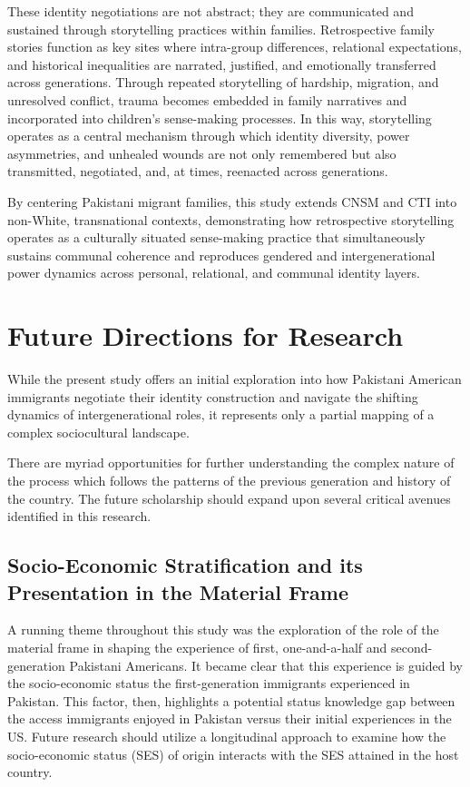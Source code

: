 These identity negotiations are not abstract; they are communicated and sustained through storytelling practices within families. Retrospective family stories function as key sites where intra-group differences, relational expectations, and historical inequalities are narrated, justified, and emotionally transferred across generations. Through repeated storytelling of hardship, migration, and unresolved conflict, trauma becomes embedded in family narratives and incorporated into children’s sense-making processes. In this way, storytelling operates as a central mechanism through which identity diversity, power asymmetries, and unhealed wounds are not only remembered but also transmitted, negotiated, and, at times, reenacted across generations.

By centering Pakistani migrant families, this study extends CNSM and CTI into non-White, transnational contexts, demonstrating how retrospective storytelling operates as a culturally situated sense-making practice that simultaneously sustains communal coherence and reproduces gendered and intergenerational power dynamics across personal, relational, and communal identity layers.

\section{Future Directions for Research}

While the present study offers an initial exploration into how Pakistani American immigrants negotiate their identity construction and navigate the shifting dynamics of intergenerational roles, it represents only a partial mapping of a complex sociocultural landscape. 

There are myriad opportunities for further understanding the complex nature of the process which follows the patterns of the previous generation and history of the country. The future scholarship should expand upon several critical avenues identified in this research.

\subsection{Socio-Economic Stratification and its Presentation in the Material Frame}

A running theme throughout this study was the exploration of the role of the material frame in shaping the experience of first, one-and-a-half and second-generation Pakistani Americans. It became clear that this experience is guided by the socio-economic status the first-generation immigrants experienced in Pakistan. This factor, then, highlights a potential status knowledge gap between the access immigrants enjoyed in Pakistan versus their initial experiences in the US. Future research should utilize a longitudinal approach to examine how the socio-economic status (SES) of origin interacts with the SES attained in the host country.

